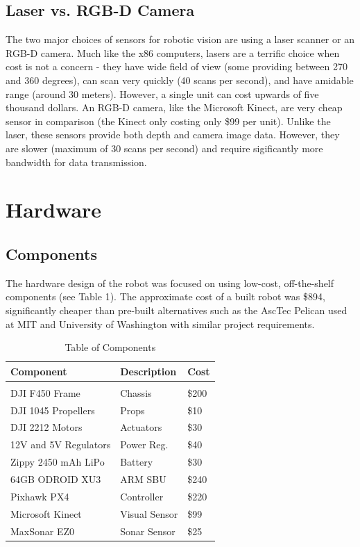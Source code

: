\documentclass[letterpaper, oneside, 10pt]{report}
\begin{document}
\subsection{Laser vs. RGB-D Camera}

The two major choices of sensors for robotic vision are using a laser scanner or an RGB-D camera. Much like the x86 computers, lasers are a terrific choice when cost is not a concern - they have wide field of view (some providing between 270 and 360 degrees), can scan very quickly (40 scans per second), and have amidable range (around 30 meters). However, a single unit can cost upwards of five thousand dollars. An RGB-D camera, like the Microsoft Kinect, are very cheap sensor in comparison (the Kinect only costing only \$99 per unit). Unlike the laser, these sensors provide both depth and camera image data. However, they are slower (maximum of 30 scans per second) and require sigificantly more bandwidth for data transmission.

\section{Hardware}

\subsection{Components}

The hardware design of the robot was focused on using low-cost, off-the-shelf components (see Table 1). The approximate cost of a built robot was \$894, significantly cheaper than pre-built alternatives such as the AscTec Pelican used at MIT \cite{bachrach2011range} and University of Washington \cite{bachrach2012estimation} with similar project requirements.

\begin{table}[h!]
  \centering
  \caption{Table of Components}
  \vspace{2mm}
  \begin{tabular}{l l l}
    \hline \hline
    \vspace{-2mm}
    Component & \multicolumn{1}{l}{Description} & \multicolumn{1}{l}{Cost} \\ [1ex]
    \hline
    & \\
    DJI F450 Frame & Chassis & \$200 \\
    DJI 1045 Propellers & Props & \$10 \\
    DJI 2212 Motors & Actuators & \$30 \\
    12V and 5V Regulators & Power Reg. & \$40 \\
    Zippy 2450 mAh LiPo & Battery & \$30 \\
    64GB ODROID XU3 & ARM SBU & \$240 \\
    Pixhawk PX4 & Controller & \$220 \\
    Microsoft Kinect & Visual Sensor & \$99 \\
    MaxSonar EZ0	& Sonar Sensor & \$25 \\
  \end{tabular}
\end{table}
\end{document}
